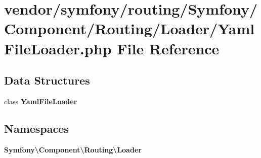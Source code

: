 \section{vendor/symfony/routing/\+Symfony/\+Component/\+Routing/\+Loader/\+Yaml\+File\+Loader.php File Reference}
\label{routing_2_symfony_2_component_2_routing_2_loader_2_yaml_file_loader_8php}
\subsection*{Data Structures}
\begin{DoxyCompactItemize}
\item 
class {\bf Yaml\+File\+Loader}
\end{DoxyCompactItemize}
\subsection*{Namespaces}
\begin{DoxyCompactItemize}
\item 
 {\bf Symfony\textbackslash{}\+Component\textbackslash{}\+Routing\textbackslash{}\+Loader}
\end{DoxyCompactItemize}
